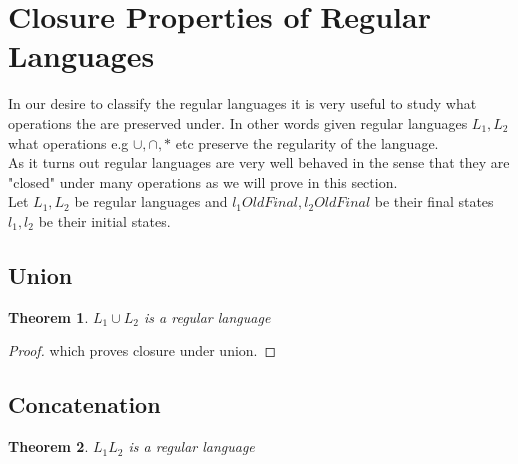 \documentclass[11pt]{exam}
\newtheorem{theorem}{Theorem}[section]
\begin{document}
\newpage

\section{Closure Properties of Regular Languages}

In our desire to classify the regular languages it is very useful to study what operations the are preserved under. In other words given regular languages $L_1,L_2$ what operations e.g $\cup,\cap,*$ etc preserve the regularity of the language.\\

As it turns out regular languages are very well behaved in the sense that they are "closed" under many operations as we will prove in this section.\\

Let $L_1,L_2$ be regular languages and $l_1OldFinal,l_2OldFinal$ be their final states $l_1,l_2$ be their initial states.

\subsection{Union}
\begin{theorem}
$L_1 \cup L_2$ is a regular language
\end{theorem} 
\begin{proof}

which proves closure under union.
\end{proof}


\subsection{Concatenation}
\begin{theorem}
$L_1L_2$ is a regular language
\end{theorem}
\end{document}
